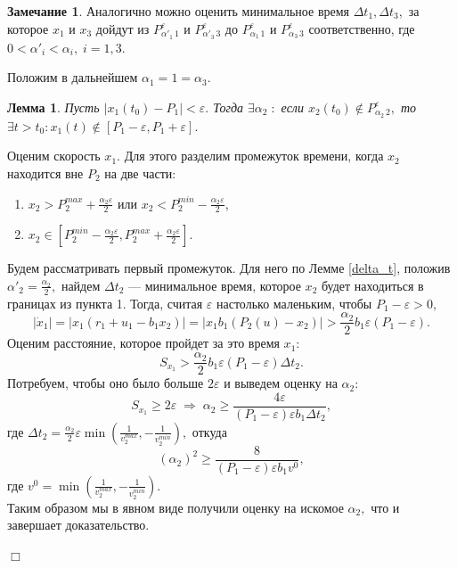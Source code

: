 \documentclass[11pt]{article}
\newtheorem{lemma}{Лемма}
\theoremstyle{definition}
\newtheorem{Remark_l}{Замечание}[lemma]
\newenvironment{Proof}
{\par\noindent{\bf Доказательство.\\}} 
{\begin{flushright}$\Box$\end{flushright}}
\begin{document}
\begin{Remark_l}
\label{rem_1}
	 Аналогично можно оценить минимальное время $\Delta t_1, \Delta t_3,$ за которое $x_1$ и $x_3$ дойдут из $P_{\alpha'_1 \, 1}^{\varepsilon} \text{ и } P_{\alpha'_3 \, 3}^{\varepsilon}$ до $P_{\alpha_1 \, 1}^{\varepsilon} \text{ и } P_{\alpha_3 \, 3}^{\varepsilon}$ соответственно, где $0 <\alpha'_i < \alpha_i, \; i = 1,3.$
\end{Remark_l}

Положим в дальнейшем $\alpha_1 = 1 = \alpha_3.$


\begin{lemma}
\label{alpha_2}
	Пусть $|x_1(t_0) - P_1| < \varepsilon.$
	Тогда $\exists \alpha_2 \;:$ если $x_2(t_0) \not \in P_{\alpha_2 \, 2}^{\varepsilon},$ то
$\exists t > t_0 : x_1(t) \not \in [P_1 - \varepsilon, P_1 + \varepsilon].$
\end{lemma}
\begin{Proof}
	Оценим скорость $x_1.$ Для этого разделим промежуток времени, когда $x_2$ находится вне $P_2$ на две части: 
	\begin{enumerate}
		\item $x_2 > P_2^{max} + \frac{\alpha_2\varepsilon}{2}$ или $x_2 < P_2^{min} - \frac{\alpha_2\varepsilon}{2}$,
		\item $x_2 \in [P_2^{min} - \frac{\alpha_2\varepsilon}{2}, P_2^{max} + \frac{\alpha_2\varepsilon}{2}].$
	\end{enumerate}
	Будем рассматривать первый промежуток. Для него по Лемме \ref{delta_t}, положив $\alpha'_2 = \frac{\alpha_2}{2},$ найдем $\Delta t_2$ --- минимальное время, которое $x_2$ будет находиться в границах из пункта 1. Тогда, считая $\varepsilon$ настолько маленьким, чтобы $P_1 - \varepsilon > 0,$
	$$|\dot x_1| = |x_1(r_1 +u_1 - b_1x_2)| = |x_1b_1(P_2(u) - x_2)| > \frac{\alpha_2}{2}b_1\varepsilon(P_1 - \varepsilon).$$ 
	Оценим расстояние, которое пройдет за это время $x_1:$
	$$S_{x_1} > \frac{\alpha_2}{2}b_1\varepsilon(P_1 - \varepsilon) \Delta t_2.$$
	Потребуем, чтобы оно было больше $2\varepsilon$ и выведем оценку на $\alpha_2:$
	$$S_{x_1} \geqslant 2 \varepsilon \; \Rightarrow \; \alpha_2 \geqslant \frac{4\varepsilon}{(P_1 - \varepsilon)\varepsilon b_1\Delta t_2},$$
	где $\Delta t_2 = \frac{\alpha_2}{2}\varepsilon\min(\frac{1}{v_2^{max}}, -\frac{1}{v_2^{min}}),$ откуда 
	$$(\alpha_2)^2 \geqslant \frac{8}{(P_1 - \varepsilon)\varepsilon b_1v^0},$$
	где $v^0 = \min(\frac{1}{v_2^{max}}, -\frac{1}{v_2^{min}}).$\\
	Таким образом мы в явном виде получили оценку на искомое $\alpha_2,$ что и завершает доказательство.
\end{Proof}
\end{document}
